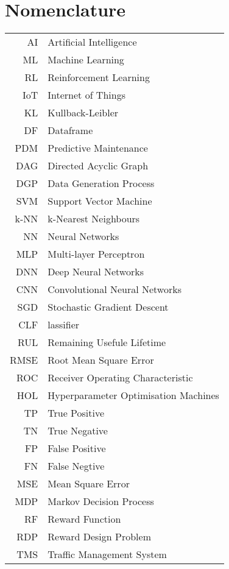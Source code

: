 \chapter*{Nomenclature}
    \thispagestyle{empty}
    \begin{center}
        \begin{tabular}{r l}
         AI & Artificial Intelligence \\
         ML & Machine Learning \\ 
         RL & Reinforcement Learning \\
         IoT & Internet of Things \\
         KL & Kullback-Leibler \\
         DF & Dataframe \\
         PDM & Predictive Maintenance \\
         DAG & Directed Acyclic Graph \\
         DGP & Data Generation Process \\
         SVM & Support Vector Machine \\
         k-NN & k-Nearest Neighbours \\
         NN & Neural Networks \\
         MLP & Multi-layer Perceptron \\
         DNN & Deep Neural Networks \\
         CNN & Convolutional Neural Networks \\
         SGD & Stochastic Gradient Descent \\
         CLF & lassifier \\
         RUL & Remaining Usefule Lifetime \\
         RMSE & Root Mean Square Error \\
         ROC & Receiver Operating Characteristic \\
         HOL & Hyperparameter Optimisation Machines \\
         TP & True Positive \\
         TN & True Negative \\
         FP & False Positive \\
         FN & False Negtive \\
         MSE & Mean Square Error \\
         MDP & Markov Decision Process \\
         RF & Reward Function \\
         RDP & Reward Design Problem \\
         TMS & Traffic Management System \\
        \end{tabular}
    \end{center}